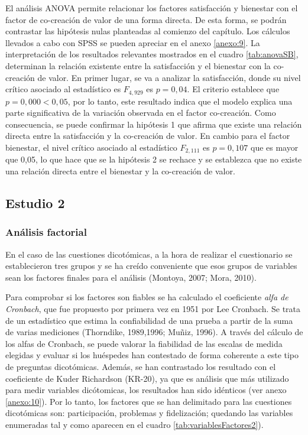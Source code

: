 El análisis ANOVA permite relacionar los factores satisfacción y bienestar con el factor de co-creación de valor de una forma directa. De esta forma, se podrán contrastar las hipótesis nulas planteadas al comienzo del capítulo. Los cálculos llevados a cabo con SPSS se pueden apreciar en el anexo \ref{anexo:9}.
La interpretación de los resultados relevantes mostrados en el cuadro \ref{tab:anovaSB}, determinan la relación existente entre la satisfacción y el bienestar con la co-creación de valor. En primer lugar, se va a analizar la satisfacción, donde su nivel crítico asociado al estadístico es $ F_{4,929} $ es $ p = 0,04 $. El criterio establece que $ p = 0,000 < 0,05 $, por lo tanto, este resultado indica que el modelo explica una parte significativa de la variación observada en el factor co-creación. Como consecuencia, se puede confirmar la hipótesis 1 que afirma que existe una relación directa entre la satisfacción y la co-creación de valor. En cambio para el factor bienestar, el nivel crítico asociado al estadístico $ F_{2,111} $ es $ p = 0,107 $ que es mayor que 0,05, lo que hace que se la hipótesis 2 se rechace y se establezca que no existe una relación directa entre el bienestar y la co-creación de valor.



\subsection{Estudio 2}

\subsubsection{Análisis factorial}

En el caso de las cuestiones dicotómicas, a la hora de realizar el cuestionario se establecieron tres grupos y se ha creído conveniente que esos grupos de variables sean los factores finales para el análisis (Montoya, 2007; Mora, 2010).

Para comprobar si los factores son fiables se ha calculado el coeficiente \emph{alfa de Cronbach}, que fue propuesto por primera vez en 1951 por Lee Cronbach. Se trata de un estadístico que estima la confiabilidad de una prueba a partir de la suma de varias mediciones (Thorndike, 1989,1996; Muñiz, 1996). A través del cálculo de los alfas de Cronbach, se puede valorar la fiabilidad de las escalas de medida elegidas y evaluar si los huéspedes han contestado de forma coherente a este tipo de preguntas dicotómicas. Además, se han contrastado los resultado con el coeficiente de Kuder Richardson (KR-20), ya que es análisis que más utilizado para medir variables dicótomicas, los resultados han sido idénticos (ver anexo \ref{anexo:10}). Por lo tanto, los factores que se han delimitado para las cuestiones dicotómicas son: participación, problemas y fidelización; quedando las variables enumeradas tal y como aparecen en el cuadro \ref{tab:variablesFactores2}). 

